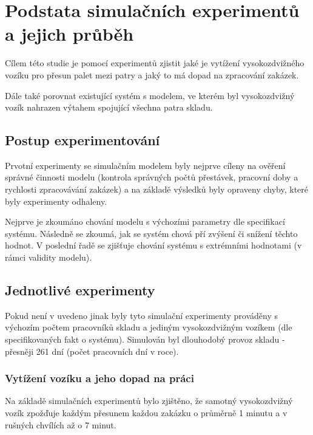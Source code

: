 \documentclass[11pt]{article}
\begin{document}
	
	\section{Podstata simulačních experimentů a jejich průběh}
	Cílem této studie je pomocí experimentů zjistit jaké je vytížení vysokozdvižného vozíku pro přesun palet mezi patry a jaký to má dopad na zpracování zakázek.
	
	Dále také porovnat existující systém s modelem, ve kterém byl vysokozdvižný vozík nahrazen výtahem spojující všechna patra skladu.
	
	\subsection{Postup experimentování}
	Prvotní experimenty se simulačním modelem byly nejprve cíleny na ověření správné činnosti modelu (kontrola správných počtů přestávek, pracovní doby a rychlosti zpracovávání zakázek) a na základě výsledků byly opraveny chyby, které byly experimenty odhaleny.
	
	Nejprve je zkoumáno chování modelu s výchozími parametry dle specifikací systému. Následně se zkoumá, jak se systém chová pří zvýšení či snížení těchto hodnot. V poslední řadě se zjišťuje chování systému s extrémními hodnotami (v rámci validity modelu).
	
	\subsection{Jednotlivé experimenty}
	Pokud není v uvedeno jinak byly tyto simulační experimenty prováděny s výchozím počtem pracovníků skladu a jediným vysokozdvižným vozíkem (dle specifikovaných fakt o systému). Simulován byl dlouhodobý provoz skladu - přesněji 261 dní (počet pracovních dní v roce).
	
	\subsubsection{Vytížení vozíku a jeho dopad na práci}
	Na základě simulačních experimentů bylo zjištěno, že samotný vysokozdvižný vozík zpožďuje každým přesunem každou zakázku o průměrně 1 minutu a v rušných chvílích až o 7 minut.
	
\end{document}
